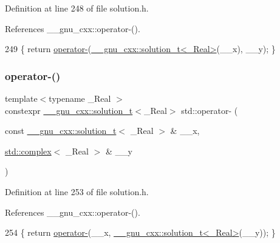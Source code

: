 Definition at line 248 of file solution.\+h.



References \+\_\+\+\_\+gnu\+\_\+cxx\+::operator-\/().


\begin{DoxyCode}
249     \{ \textcolor{keywordflow}{return} \hyperlink{namespacestd_a4f4e9391eaa235d953faa99bff006e3d}{operator-}(\hyperlink{namespace____gnu__cxx_ae20ea642de50eb361074c62676b0159c}{\_\_gnu\_cxx::solution\_t<\_Real>}(\_\_x), \_\_y); \}
\end{DoxyCode}
\mbox{\label{namespacestd_a308d96e2c3172aebb97f03880e8c5946}} 
\subsubsection{\texorpdfstring{operator-\/()}{operator-()}\hspace{0.1cm}{\footnotesize\ttfamily [5/6]}}
{\footnotesize\ttfamily template$<$typename \+\_\+\+Real $>$ \\
constexpr \hyperlink{namespace____gnu__cxx_ae20ea642de50eb361074c62676b0159c}{\+\_\+\+\_\+gnu\+\_\+cxx\+::solution\+\_\+t}$<$\+\_\+\+Real$>$ std\+::operator-\/ (\begin{DoxyParamCaption}\item[{const \hyperlink{namespace____gnu__cxx_ae20ea642de50eb361074c62676b0159c}{\+\_\+\+\_\+gnu\+\_\+cxx\+::solution\+\_\+t}$<$ \+\_\+\+Real $>$ \&}]{\+\_\+\+\_\+x,  }\item[{\hyperlink{classstd_1_1complex}{std\+::complex}$<$ \+\_\+\+Real $>$ \&}]{\+\_\+\+\_\+y }\end{DoxyParamCaption})}



Definition at line 253 of file solution.\+h.



References \+\_\+\+\_\+gnu\+\_\+cxx\+::operator-\/().


\begin{DoxyCode}
254     \{ \textcolor{keywordflow}{return} \hyperlink{namespacestd_a4f4e9391eaa235d953faa99bff006e3d}{operator-}(\_\_x, \hyperlink{namespace____gnu__cxx_ae20ea642de50eb361074c62676b0159c}{\_\_gnu\_cxx::solution\_t<\_Real>}(\_\_y)); \}
\end{DoxyCode}
\mbox{\label{namespacestd_a4f4e9391eaa235d953faa99bff006e3d}} 
